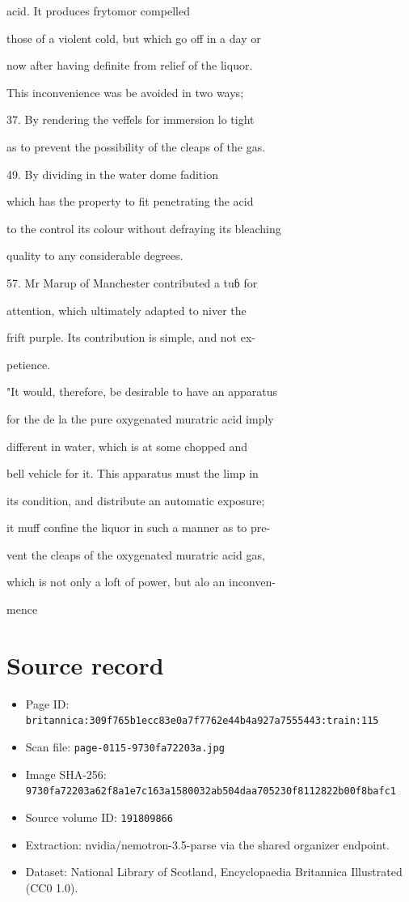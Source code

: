 \documentclass{article}
\begin{document}
acid. It produces frytomor compelled

those of a violent cold, but which go off in a day or

now after having definite from relief of the liquor.

This inconvenience was be avoided in two ways;

37. By rendering the veffels for immersion lo tight

as to prevent the possibility of the cleaps of the gas.

49. By dividing in the water dome fadition

which has the property to fit penetrating the acid

to the control its colour without defraying its bleaching

quality to any considerable degrees.

57. Mr Marup of Manchester contributed a tuɓ for

attention, which ultimately adapted to niver the

frift purple. Its contribution is simple, and not ex-

petience.

"It would, therefore, be desirable to have an apparatus

for the de la the pure oxygenated muratric acid imply

different in water, which is at some chopped and

bell vehicle for it. This apparatus must the limp in

its condition, and distribute an automatic exposure;

it muff confine the liquor in such a manner as to pre-

vent the cleaps of the oxygenated muratric acid gas,

which is not only a loft of power, but alo an inconven-

mence

\section*{Source record}
\begin{itemize}
\item Page ID: \texttt{britannica:309f765b1ecc83e0a7f7762e44b4a927a7555443:train:115}
\item Scan file: \texttt{page-0115-9730fa72203a.jpg}
\item Image SHA-256: \texttt{9730fa72203a62f8a1e7c163a1580032ab504daa705230f8112822b00f8bafc1}
\item Source volume ID: \texttt{191809866}
\item Extraction: nvidia/nemotron-3.5-parse via the shared organizer endpoint.
\item Dataset: National Library of Scotland, Encyclopaedia Britannica Illustrated (CC0 1.0).
\end{itemize}
\end{document}
